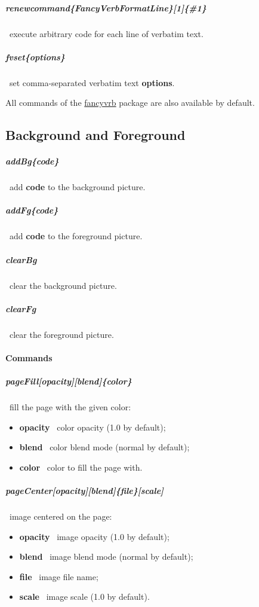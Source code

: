 \documentclass[english,12pt,openany,letterpaper]{book}
\begin{document}
\subparagraph{\bs renewcommand\{\bs FancyVerbFormatLine\}[1]\{\#1\}} \dash\ execute arbitrary code for each line of verbatim text.

\subparagraph{\bs fvset\{options\}} \dash\ set comma-separated verbatim text \textbf{options}.

All commands of the \href{https://www.ctan.org/pkg/fancyvrb}{fancyvrb} package are also available by default.

\vfill
\cleartorightpage

\subsection{Background and Foreground}

\subparagraph{\bs addBg\{code\}} \dash\ add \textbf{code} to the background picture.

\subparagraph{\bs addFg\{code\}} \dash\ add \textbf{code} to the foreground picture.

\subparagraph{\bs clearBg} \dash\ clear the background picture.

\subparagraph{\bs clearFg} \dash\ clear the foreground picture.

\skipline

\paragraph{Commands}

\subparagraph{\bs pageFill[opacity][blend]\{color\}} \dash\ fill the page with the given color:
\begin{itemize}
	\item \textbf{opacity} \dash\ color opacity (1.0 by default);
	\item \textbf{blend} \dash\ color blend mode (normal by default);
	\item \textbf{color} \dash\ color to fill the page with.
\end{itemize}

\subparagraph{\bs pageCenter[opacity][blend]\{file\}[scale]} \dash\ image centered on the page:
\begin{itemize}
	\item \textbf{opacity} \dash\ image opacity (1.0 by default);
	\item \textbf{blend} \dash\ image blend mode (normal by default);
	\item \textbf{file} \dash\ image file name;
	\item \textbf{scale} \dash\ image scale (1.0 by default).
\end{itemize}
\end{document}
